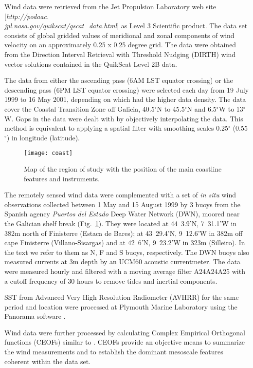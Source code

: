 Wind data were retrieved from the Jet Propulsion Laboratory web
site [{\it http://podaac.\\
jpl.nasa.gov/quikscat/qscat\_data.html}] as Level
3 Scientific product. The data set consists of global gridded
values of meridional and zonal components of wind velocity on an
approximately 0.25 x 0.25 degree grid. The data were obtained from
the Direction Interval Retrieval with Threshold Nudging (DIRTH)
wind vector solutions contained in the QuikScat Level 2B data.

The data from either the ascending pass (6AM LST equator crossing)
or the descending pass (6PM LST equator crossing) were selected
each day from 19 July 1999 to 16 May 2001, depending on which had
the higher data density. The data cover the Coastal Transition
Zone off Galicia, 40.5$^{\circ}$N to 45.5$^{\circ}$N and
6.5$^{\circ}$W to 13$^{\circ}$W. Gaps in the data were dealt with
by objectively interpolating the data. This method is equivalent
to applying a spatial filter with smoothing scales 0.25$^{\circ}$
(0.55$^{\circ}$) in longitude (latitude).

\begin{figure}
\centering
\texttt{[image: coast]}
\caption{Map of the region of study with the position of the main
coastline features and instruments. }\label{fig:ib}
\end{figure}

The remotely sensed wind data were complemented with a set of {\it
in situ} wind observations collected between 1 May and 15 August
1999 by 3 buoys from the Spanish agency {\it Puertos del Estado}
Deep Water Network (DWN), moored near the Galician shelf break
(Fig.~\ref{fig:ib}). They were located at 44\deg~3.9'N,
7\deg~31.1'W in 382m north of Finisterre (Estaca de Bares); at
43\deg~29.4'N, 9\deg~12.6'W in 382m off cape Finisterre
(Villano-Sisargas) and at 42\deg~6'N, 9\deg~23.2'W in 323m
(Silleiro). In the text we refer to them as N, F and S buoys,
respectively. The DWN buoys also measured currents at 3m depth by
an UCM60 acoustic currentmeter. The data were measured hourly and
filtered with a moving average filter A24A24A25 \citep{Godin91}
with a cutoff frequency of 30 hours to remove tides and inertial
components.

SST from Advanced Very High Resolution Radiometer (AVHRR) for the
same period and location were processed at Plymouth Marine
Laboratory using the Panorama software \citep{Miller97} .

Wind data were further processed by calculating Complex Empirical
Orthogonal functions (CEOFs) similar to \citet{Munchow00}. CEOFs
provide an objective means to summarize the wind measurements and
to establish the dominant mesoscale features coherent within the
data set.


